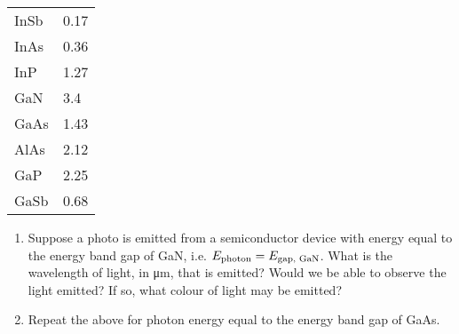 \documentclass[fleqn, a4paper, 11pt, oneside]{amsart}
\theoremstyle{definition}
\theoremstyle{theorem}
\begin{document}
\begin{solution}
\begin{table}[H]
\begin{tabular}{|l|l|}
			\hline
			InSb                                               & 0.17                                 \\
			InAs                                               & 0.36                                 \\
			InP                                                & 1.27                                 \\
			GaN                                                & 3.4                                  \\
			GaAs                                               & 1.43                                 \\
			AlAs                                               & 2.12                                 \\
			GaP                                                & 2.25                                 \\
			GaSb                                               & 0.68                                 \\
			\hline
		\end{tabular}
	\end{table}
\end{solution}

\begin{question}
	\begin{enumerate}
		\item
			Suppose a photo is emitted from a semiconductor device with energy equal to the energy band gap of GaN, i.e. $E_{\textnormal{photon}} = E_{\textnormal{gap, GaN}}$.
			What is the wavelength of light, in \si{\micro\metre}, that is emitted?
			Would we be able to observe the light emitted?
			If so, what colour of light may be emitted?
		\item
			Repeat the above for photon energy equal to the energy band gap of GaAs.
	\end{enumerate}
\end{question}
\end{document}
